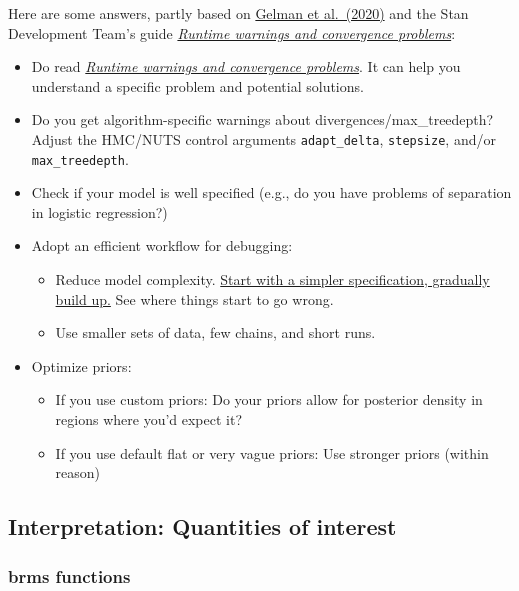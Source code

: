 \documentclass[
  11pt,
]{article}
\providecommand{\tightlist}{%
  \setlength{\itemsep}{0pt}\setlength{\parskip}{0pt}}
\begin{document}
Here are some answers, partly based on \href{https://arxiv.org/abs/2011.01808}{Gelman et al.~(2020)} and the Stan Development Team's guide \href{https://mc-stan.org/misc/warnings.html}{\emph{Runtime warnings and convergence problems}}:

\begin{itemize}
\tightlist
\item
  Do read \href{https://mc-stan.org/misc/warnings.html}{\emph{Runtime warnings and convergence problems}}. It can help you understand a specific problem and potential solutions.
\item
  Do you get algorithm-specific warnings about divergences/max\_treedepth? Adjust the HMC/NUTS control arguments \texttt{adapt\_delta}, \texttt{stepsize}, and/or \texttt{max\_treedepth}.
\item
  Check if your model is well specified (e.g., do you have problems of separation in logistic regression?)
\item
  Adopt an efficient workflow for debugging:

  \begin{itemize}
  \tightlist
  \item
    Reduce model complexity. \href{https://hyunjimoon.github.io/SBC/articles/small_model_workflow.html}{Start with a simpler specification, gradually build up.} See where things start to go wrong.
  \item
    Use smaller sets of data, few chains, and short runs.
  \end{itemize}
\item
  Optimize priors:

  \begin{itemize}
  \tightlist
  \item
    If you use custom priors: Do your priors allow for posterior density in regions where you'd expect it?
  \item
    If you use default flat or very vague priors: Use stronger priors (within reason)
  \end{itemize}
\end{itemize}

\hypertarget{interpretation-quantities-of-interest}{%
\subsection{Interpretation: Quantities of interest}\label{interpretation-quantities-of-interest}}

\hypertarget{brms-functions}{%
\subsubsection{brms functions}\label{brms-functions}}
\end{document}
